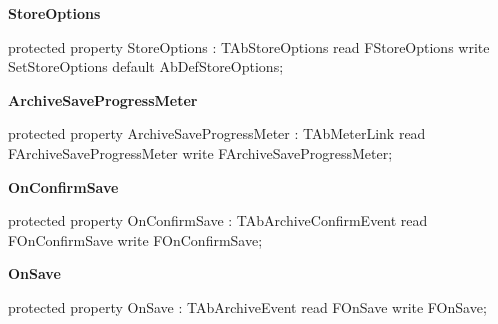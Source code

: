 \documentclass{report}
\newif\ifpdf
\begin{document}
\begin{list}{}
\begin{flushleft}
\ifpdf
\end{flushleft}
\fi


\par  \label{AbZipper.TAbCustomZipper-StoreOptions}
\item[\textbf{StoreOptions}\hfill]
\ifpdf
\begin{flushleft}
\fi
\begin{ttfamily}
protected property StoreOptions : TAbStoreOptions
      read  FStoreOptions
      write SetStoreOptions
      default AbDefStoreOptions;\end{ttfamily}

\ifpdf
\end{flushleft}
\fi


\par  \label{AbZipper.TAbCustomZipper-ArchiveSaveProgressMeter}
\item[\textbf{ArchiveSaveProgressMeter}\hfill]
\ifpdf
\begin{flushleft}
\fi
\begin{ttfamily}
protected property ArchiveSaveProgressMeter : TAbMeterLink                   
      read  FArchiveSaveProgressMeter                                  
      write FArchiveSaveProgressMeter;\end{ttfamily}

\ifpdf
\end{flushleft}
\fi


\par  \label{AbZipper.TAbCustomZipper-OnConfirmSave}
\item[\textbf{OnConfirmSave}\hfill]
\ifpdf
\begin{flushleft}
\fi
\begin{ttfamily}
protected property OnConfirmSave : TAbArchiveConfirmEvent
      read  FOnConfirmSave
      write FOnConfirmSave;\end{ttfamily}

\ifpdf
\end{flushleft}
\fi


\par  \label{AbZipper.TAbCustomZipper-OnSave}
\item[\textbf{OnSave}\hfill]
\ifpdf
\begin{flushleft}
\fi
\begin{ttfamily}
protected property OnSave : TAbArchiveEvent
      read  FOnSave
      write FOnSave;\end{ttfamily}


\end{flushleft}
\end{list}
\end{document}
